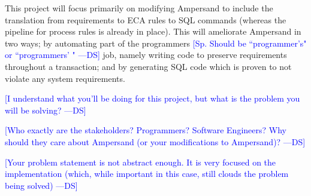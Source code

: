 \documentclass[12pt]{article}
\newcommand{\authornote}[3]{\textcolor{#1}{[#3 ---#2]}}
\newcommand{\authornote}[3]{}
\newcommand{\ds}[1]{\authornote{blue}{DS}{#1}}
\begin{document}
This project will focus primarily on modifying Ampersand to include the
translation from requirements to ECA rules to SQL commands (whereas the pipeline
for process rules is already in place). This will ameliorate Ampersand in two
ways; by automating part of the programmers \ds{Sp. Should be ``programmer's" or
``programmers' "} job, namely writing code to preserve
requirements throughout a transaction; and by generating SQL code which is
proven to not violate any system requirements. 

\ds{I understand what you'll be doing for this project, but what is the problem
you will be solving?}

\ds{Who exactly are the stakeholders? Programmers? Software Engineers? Why
should they care about Ampersand (or your modifications to Ampersand)?}

\ds{Your problem statement is not abstract enough. It is very focused on the 
implementation (which, while important in this case, still clouds the problem
being solved)}
\end{document}
